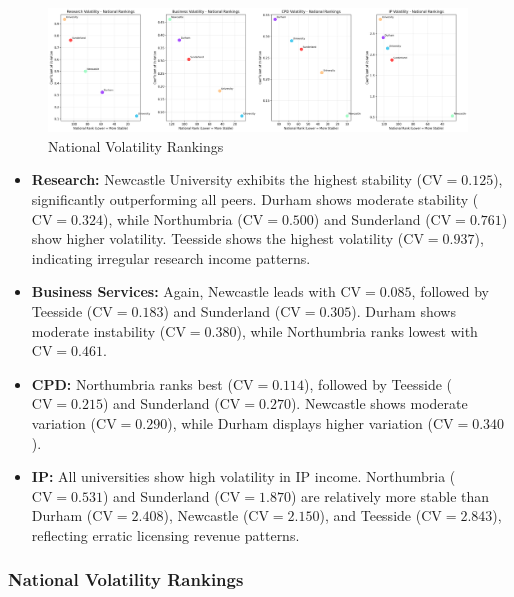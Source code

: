 \documentclass[journal,onecolumn, 10pt,draftclsnofoot]{IEEEtran}
\begin{document}
\begin{figure}[h]
\centering
\includegraphics[width=0.99\textwidth]{Fig/figure42.national_volatility_rankings.png}
\caption{National Volatility Rankings}
\label{fig:national-volatility-rankings}
\end{figure}

\begin{itemize}
    \item \textbf{Research:} Newcastle University exhibits the highest stability ($\mathrm{CV}=0.125$), significantly outperforming all peers. Durham shows moderate stability ($\mathrm{CV}=0.324$), while Northumbria ($\mathrm{CV}=0.500$) and Sunderland ($\mathrm{CV}=0.761$) show higher volatility. Teesside shows the highest volatility ($\mathrm{CV}=0.937$), indicating irregular research income patterns.
    
    \item \textbf{Business Services:} Again, Newcastle leads with $\mathrm{CV}=0.085$, followed by Teesside ($\mathrm{CV}=0.183$) and Sunderland ($\mathrm{CV}=0.305$). Durham shows moderate instability ($\mathrm{CV}=0.380$), while Northumbria ranks lowest with $\mathrm{CV}=0.461$.
    
    \item \textbf{CPD:} Northumbria ranks best ($\mathrm{CV}=0.114$), followed by Teesside ($\mathrm{CV}=0.215$) and Sunderland ($\mathrm{CV}=0.270$). Newcastle shows moderate variation ($\mathrm{CV}=0.290$), while Durham displays higher variation ($\mathrm{CV}=0.340$).
    
    \item \textbf{IP:} All universities show high volatility in IP income. Northumbria ($\mathrm{CV}=0.531$) and Sunderland ($\mathrm{CV}=1.870$) are relatively more stable than Durham ($\mathrm{CV}=2.408$), Newcastle ($\mathrm{CV}=2.150$), and Teesside ($\mathrm{CV}=2.843$), reflecting erratic licensing revenue patterns.
\end{itemize}

\subsubsection{National Volatility Rankings}
\end{document}
